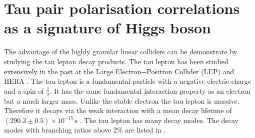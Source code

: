 




\section{Tau pair polarisation correlations as a signature of Higgs boson}
\label{sec:theoryTauPair}

The advantage of the highly granular linear colliders can be demonstrate by studying the tau lepton decay products. The tau lepton has been studied extensively in the past at the Large Electron$-$Positron Collider (LEP)\cite{Schael:2005am} and HERA \cite{Aktas:2006fc}.  The tau lepton is a fundamental particle with a negative electric charge and a spin of $\frac{1}{2}$. It has the same fundamental interaction property as an electron but a much larger mass. Unlike the stable electron the tau lepton is massive. Therefore it decays via the weak interaction with a mean decay lifetime of $(290.3\pm0.5)\times10^{-15}$\,s \cite{Abreu:1991jn}. The tau lepton has many decay modes. The decay modes with branching ratios above 2\% are listed in .

